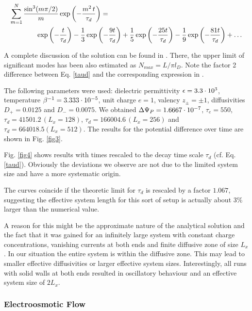 \begin{eqnarray}
\sum_{m=1}^N \frac{\sin^3(m\pi/2)}{m} \exp\left(-\frac{m^2\, t}{\tau_d}\right)&=&\nonumber\\
&&\hspace*{-4cm} \exp\left(-\frac{t}{\tau_d}\right)-\frac{1}{3} \exp\left(-\frac{9 t}{\tau_d}\right)+\frac{1}{5}\exp\left(-\frac{25t}{\tau_d}\right)-\frac{1}{9}\exp\left(-\frac{81 t}{\tau_d}\right)+\ldots
\end{eqnarray}

A complete discussion of the solution can be found in \cite{Mafe}. 
There, the upper limit of significant modes has been also estimated as $N_{max} = L/\pi l_D$.
Note the factor 2 difference between Eq. \ref{taud} and the corresponding expression in \cite{Mafe}.

The following parameters were used:
dielectric permittivity $\epsilon=3.3\cdot10^{3}$, temperature $\beta^{-1}=3.333\cdot10^{-5}$, unit charge $e=1$, valency $z_\pm=\pm1$, diffusivities $D_+=0.0125$ and $D_-=0.0075$.
We obtained
$\Delta\Psi_P=1.6667\cdot10^{-7}$, $\tau_e=550$, $\tau_d=41501.2\, (L_x=128)$, $\tau_d=166004.6\, (L_x=256)$ and $\tau_d=664018.5 (L_x=512)$.
The results for the potential difference over time are shown in Fig. \ref{fig3}.

Fig. \ref{fig4} shows results with times rescaled to the decay 
time scale $\tau_d$ (cf. Eq. \ref{taud}). Obviously the 
deviations we observe are not due to the limited system size 
and have a more systematic origin. 

The curves coincide if 
the theoretic limit for $\tau_d$ is rescaled by a factor $1.067$,
suggesting the effective system length for this sort of setup is
actually about 3\% larger than the numerical value.

A reason for this might be the approximate nature of the analytical solution 
and the fact that it was gained
for an infinitely large system with constant charge concentrations,
vanishing currents at both ends and finite diffusive zone of size $L_x$.
In our situation the entire system is within the diffusive zone.
This may lead to smaller effective diffusivities or larger effective
system sizes.
Interestingly, all runs with solid walls at both ends resulted in 
oscillatory behaviour and an effective system size of $2L_x$.


\subsubsection{Electroosmotic Flow}

